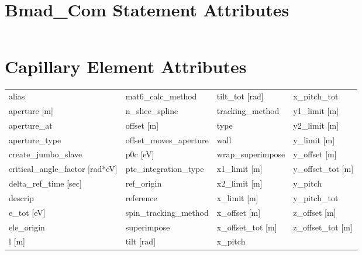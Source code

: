  \section{Bmad_Com Statement Attributes}
 \label{s:list.bmad.com}
 
 \begin{tabular}{llll} \toprule
 \bottomrule
 \end{tabular}
 \vfill
 
 \section{Capillary Element Attributes}
 \label{s:list.capillary}
 
 \begin{tabular}{llll} \toprule
alias                            & mat6_calc_method                 & tilt_tot [rad]                   & x_pitch_tot                      \\
aperture [m]                     & n_slice_spline                   & tracking_method                  & y1_limit [m]                     \\
aperture_at                      & offset [m]                       & type                             & y2_limit [m]                     \\
aperture_type                    & offset_moves_aperture            & wall                             & y_limit [m]                      \\
create_jumbo_slave               & p0c [eV]                         & wrap_superimpose                 & y_offset [m]                     \\
critical_angle_factor [rad*eV]   & ptc_integration_type             & x1_limit [m]                     & y_offset_tot [m]                 \\
delta_ref_time [sec]             & ref_origin                       & x2_limit [m]                     & y_pitch                          \\
descrip                          & reference                        & x_limit [m]                      & y_pitch_tot                      \\
e_tot [eV]                       & spin_tracking_method             & x_offset [m]                     & z_offset [m]                     \\
ele_origin                       & superimpose                      & x_offset_tot [m]                 & z_offset_tot [m]                 \\
l [m]                            & tilt [rad]                       & x_pitch                          &                                  \\
 \bottomrule
 \end{tabular}
 \vfill
 
